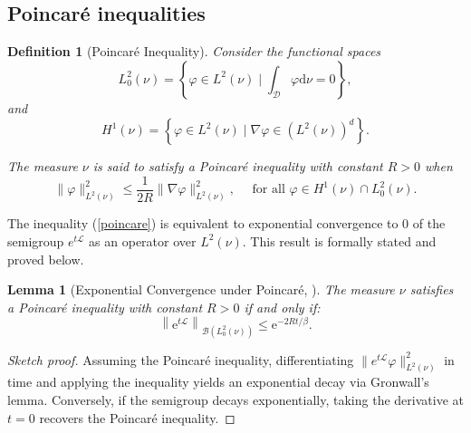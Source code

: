 \documentclass[11pt, twoside]{report}
\newtheorem{definition}[theorem]{Definition}
\newtheorem{lemma}[theorem]{Lemma}
\begin{document}
\subsection{Poincar\'{e} inequalities}
\begin{definition}[Poincar\'{e} Inequality]
    Consider the functional spaces
    $$
L_0^2(\nu)=\left\{\varphi \in L^2(\nu) \mid \int_{\mathcal{D}} \varphi \mathrm{d} \nu=0\right\},
$$
and
$$
H^1(\nu)=\left\{\varphi \in L^2(\nu) \mid \nabla \varphi \in\left(L^2(\nu)\right)^d\right\} .
$$

The measure $\nu$ is said to satisfy a Poincaré inequality with constant $R>0$ when
\begin{equation} \label{poincare}
    \|\varphi\|_{L^2(\nu)}^2 \leqslant \frac{1}{2 R}\|\nabla \varphi\|_{L^2(\nu)}^2, \quad \text { for all } \varphi \in H^1(\nu) \cap L_0^2(\nu).
\end{equation}
\end{definition}
The inequality (\ref{poincare}) is equivalent to exponential convergence to 0 of the semigroup $e^{t\mathcal{L}}$ as an operator over $L^2(\nu)$. This result is formally stated and proved below.
\begin{lemma}[Exponential Convergence under Poincar\'{e}, \texorpdfstring{\cite[Proposition~2.3]{Lelievre2016-hx}}{}]
The measure $\nu$ satisfies a Poincar\'{e} inequality with constant $R>0$ if and only if:
\begin{equation}
\left\|\mathrm{e}^{t \mathcal{L}}\right \|_{\mathcal{B}\left(L_0^2(\nu)\right)} \leqslant \mathrm{e}^{-2 R t / \beta}.
\end{equation}
\end{lemma}

\begin{proof}[Sketch proof]
Assuming the Poincar\'e inequality, differentiating $\| e^{t \mathcal{L}} \varphi \|_{L^2(\nu)}^2$ in time and applying the inequality yields an exponential decay via Gronwall's lemma. Conversely, if the semigroup decays exponentially, taking the derivative at $t=0$ recovers the Poincar\'e inequality. 
\end{proof}
\end{document}
